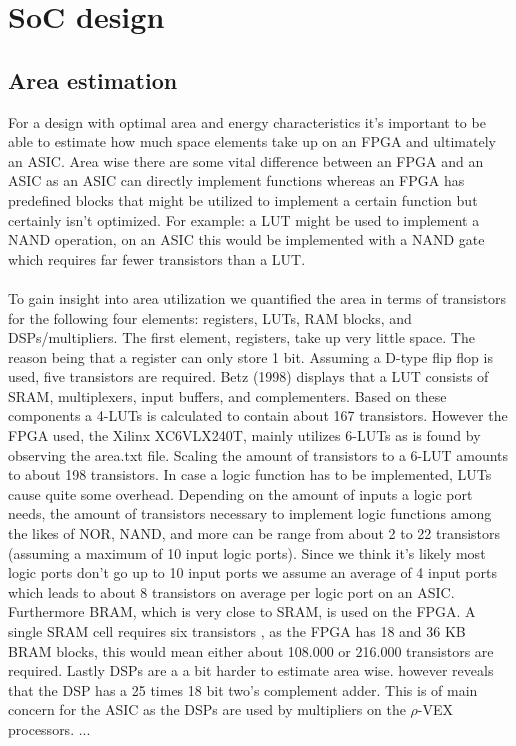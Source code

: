 \section{SoC design}
\subsection{Area estimation}
For a design with optimal area and energy characteristics it's important to be able to estimate how much space elements take up on an FPGA and ultimately an ASIC. Area wise there are some vital difference between an FPGA and an ASIC as an ASIC can directly implement functions whereas an FPGA has predefined blocks that might be utilized to implement a certain function but certainly isn't optimized. For example: a LUT might be used to implement a NAND operation, on an ASIC this would be implemented with a NAND gate which requires far fewer transistors than a LUT.\\\\
To gain insight into area utilization we quantified the area in terms of transistors for the following four elements: registers, LUTs, RAM blocks, and DSPs/multipliers. The first element, registers, take up very little space. The reason being that a register can only store 1 bit. Assuming a D-type flip flop is used, five transistors are required. %
Betz (1998) displays that a LUT consists of SRAM, multiplexers, input buffers, and complementers. Based on these components a 4-LUTs is calculated to contain about 167 transistors. However the FPGA used, the Xilinx XC6VLX240T, mainly utilizes 6-LUTs as is found by observing the area.txt file. Scaling the amount of transistors to a 6-LUT amounts to about 198 transistors. In case a logic function has to be implemented, LUTs cause quite some overhead. Depending on the amount of inputs a logic port needs, the amount of transistors necessary to implement logic functions among the likes of NOR, NAND, and more can be range from about 2 to 22 transistors (assuming a maximum of 10 input logic ports). Since we think it's likely most logic ports don't go up to 10 input ports we assume an average of 4 input ports which leads to about 8 transistors on average per logic port on an ASIC.\\
Furthermore BRAM, which is very close to SRAM, is used on the FPGA. A single SRAM cell requires six transistors  %
, as the FPGA has 18 and 36 KB BRAM blocks, this would mean either about 108.000 or 216.000 transistors are required. Lastly DSPs are a a bit harder to estimate area wise. %
however reveals that the DSP has a 25 times 18 bit two's complement adder. This is of main concern for the ASIC as the DSPs are used by multipliers on the $\rho$-VEX processors. ...

